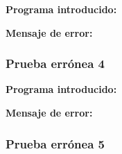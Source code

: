 \documentclass[11pt, , a4paper, titlepage]{article}
\newenvironment{changemargin}[2]{%
\begin{list}{}{%
\setlength{\topsep}{0pt}%
\setlength{\leftmargin}{#1}%
\setlength{\rightmargin}{#2}%
\setlength{\listparindent}{\parindent}%
\setlength{\itemindent}{\parindent}%
\setlength{\parsep}{\parskip}%
}%
\item[]}{\end{list}}
\begin{document}
\begin{changemargin}{+0.5cm}{+0cm}
    \vspace{1mm}

    \textbf{Programa introducido:}
    \begin{changemargin}{+0.5cm}{+0cm}
        
    \end{changemargin}

    \vspace{2mm}

    \textbf{Mensaje de error:}
    \vspace{1mm}
    \begin{changemargin}{+0.5cm}{+0cm}
    \end{changemargin}

\end{changemargin}

\subsubsection{Prueba errónea 4}

\begin{changemargin}{+0.5cm}{+0cm}
    \vspace{1mm}

    \textbf{Programa introducido:}
    \begin{changemargin}{+0.5cm}{+0cm}
        
    \end{changemargin}

    \vspace{2mm}

    \textbf{Mensaje de error:}
    \vspace{1mm}
    \begin{changemargin}{+0.5cm}{+0cm}
    \end{changemargin}

\end{changemargin}

\subsubsection{Prueba errónea 5}
\end{document}
